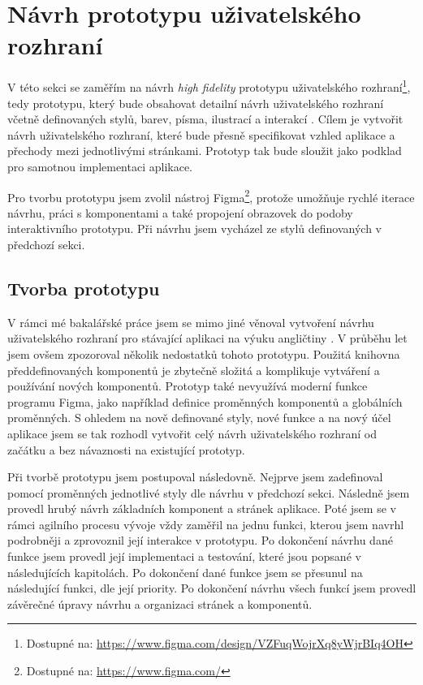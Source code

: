 \section{Návrh prototypu uživatelského rozhraní}

V této sekci se zaměřím na návrh \textit{high fidelity} prototypu uživatelského rozhraní\footnote{Dostupné na: \href{https://www.figma.com/design/VZFuqWojrXq8yWjrBIq4OH}{https://www.figma.com/design/VZFuqWojrXq8yWjrBIq4OH}}, tedy prototypu, který bude obsahovat detailní návrh uživatelského rozhraní včetně definovaných stylů, barev, písma, ilustrací a interakcí \cite[53-54]{NURUIDesignSteps}. Cílem je vytvořit návrh uživatelského rozhraní, které bude přesně specifikovat vzhled aplikace a přechody mezi jednotlivými stránkami. Prototyp tak bude sloužit jako podklad pro samotnou implementaci aplikace.

Pro tvorbu prototypu jsem zvolil nástroj Figma\footnote{Dostupné na: \href{https://www.figma.com/}{https://www.figma.com/}}, protože umožňuje rychlé iterace návrhu, práci s komponentami a také propojení obrazovek do podoby interaktivního prototypu. Při návrhu jsem vycházel ze stylů definovaných v předchozí sekci.

\subsection{Tvorba prototypu}

V rámci mé bakalářské práce jsem se mimo jiné věnoval vytvoření návrhu uživatelského rozhraní pro stávající aplikaci na výuku angličtiny \cite{Jenicek2024BachelorThesis}. V průběhu let jsem ovšem zpozoroval několik nedostatků tohoto prototypu. Použitá knihovna předdefinovaných komponentů je zbytečně složitá a komplikuje vytváření a používání nových komponentů. Prototyp také nevyužívá moderní funkce programu Figma, jako například definice proměnných komponentů a globálních proměnných. S ohledem na nově definované styly, nové funkce a na nový účel aplikace jsem se tak rozhodl vytvořit celý návrh uživatelského rozhraní od začátku a bez návaznosti na existující prototyp.

Při tvorbě prototypu jsem postupoval následovně. Nejprve jsem zadefinoval pomocí proměnných jednotlivé styly dle návrhu v předchozí sekci. Následně jsem provedl hrubý návrh základních komponent a stránek aplikace. Poté jsem se v rámci agilního procesu vývoje vždy zaměřil na jednu funkci, kterou jsem navrhl podrobněji a zprovoznil její interakce v prototypu. Po dokončení návrhu dané funkce jsem provedl její implementaci a testování, které jsou popsané v následujících kapitolách. Po dokončení dané funkce jsem se přesunul na následující funkci, dle její priority. Po dokončení návrhu všech funkcí jsem provedl závěrečné úpravy návrhu a organizaci stránek a komponentů.

